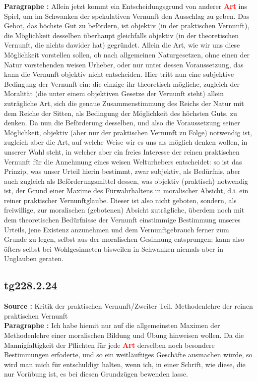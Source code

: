 \documentclass[a4paper,12pt,twoside]{book}
\newcommand{\match}[1]{\textcolor{red}{\textbf{#1}}}
\begin{document}
	\noindent\textbf{Paragraphe : }Allein jetzt kommt ein Entscheidungsgrund von anderer \match{Art} ins Spiel, um im Schwanken der spekulativen Vernunft den Ausschlag zu geben. Das Gebot, das höchste Gut zu befördern, ist objektiv (in der praktischen Vernunft), die Möglichkeit desselben überhaupt gleichfalls objektiv (in der theoretischen Vernunft, die nichts dawider hat) gegründet. Allein die Art, wie wir uns diese Möglichkeit vorstellen sollen, ob nach allgemeinen Naturgesetzen, ohne einen der Natur vorstehenden weisen Urheber, oder nur unter dessen Voraussetzung, das kann die Vernunft objektiv nicht entscheiden. Hier tritt nun eine subjektive Bedingung der Vernunft ein: die einzige ihr theoretisch mögliche, zugleich der Moralität (die unter einem objektiven Gesetze der Vernunft steht) allein zuträgliche Art, sich die genaue Zusammenstimmung des Reichs der Natur mit dem Reiche der Sitten, als Bedingung der Möglichkeit des höchsten Guts, zu denken. Da nun die Beförderung desselben, und also die Voraussetzung seiner Möglichkeit, objektiv (aber nur der praktischen Vernunft zu Folge) notwendig ist, zugleich aber die Art, auf welche Weise wir es uns als möglich denken wollen, in unserer Wahl steht, in welcher aber ein freies Interesse der reinen praktischen Vernunft für die Annehmung eines weisen Welturhebers entscheidet: so ist das Prinzip, was unser Urteil hierin bestimmt, zwar subjektiv, als Bedürfnis, aber auch zugleich als Beförderungsmittel dessen, was objektiv (praktisch) notwendig ist, der Grund einer Maxime des Fürwahrhaltens in moralischer Absicht, d.i. ein reiner praktischer Vernunftglaube. Dieser ist also nicht geboten, sondern, als freiwillige, zur moralischen (gebotenen) Absicht zuträgliche, überdem noch mit dem theoretischen Bedürfnisse der Vernunft einstimmige Bestimmung unseres Urteils, jene Existenz anzunehmen  und dem Vernunftgebrauch ferner zum Grunde zu legen, selbst aus der moralischen Gesinnung entsprungen; kann also öfters selbst bei Wohlgesinneten bisweilen in Schwanken niemals aber in Unglauben geraten. 
	
	\subsection*{tg228.2.24} 
	\textbf{Source : }Kritik der praktischen Vernunft/Zweiter Teil. Methodenlehre der reinen praktischen Vernunft\\  
	
	\noindent\textbf{Paragraphe : }Ich habe hiemit nur auf die allgemeinsten Maximen der Methodenlehre einer moralischen Bildung und Übung hinweisen wollen. Da die Mannigfaltigkeit der Pflichten für jede \match{Art} derselben noch besondere Bestimmungen erfoderte, und so ein weitläuftiges Geschäfte ausmachen würde, so wird man mich für entschuldigt halten, wenn ich, in einer Schrift, wie diese, die nur Vorübung ist, es bei diesen Grundzügen bewenden lasse. 
	
\end{document}
